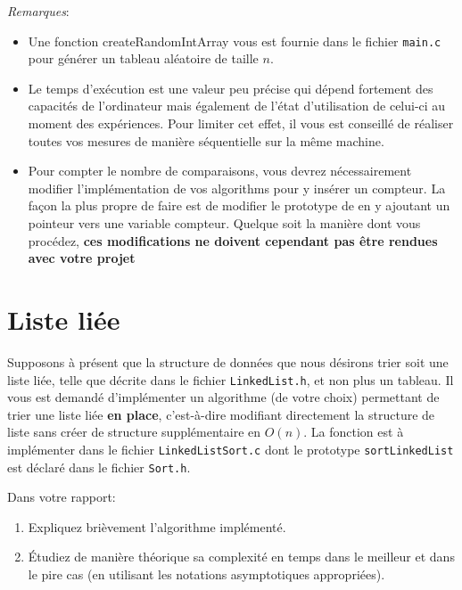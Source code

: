 \documentclass[a4paper,10pt]{article}
\begin{document}
{\em Remarques}:
\begin{itemize}
\item Une fonction createRandomIntArray vous est fournie dans le
  fichier \texttt{main.c} pour générer un tableau aléatoire de taille
  $n$.
\item Le temps d'exécution est une valeur peu précise qui dépend
  fortement des capacités de l'ordinateur mais également de l'état
  d'utilisation de celui-ci au moment des expériences. Pour limiter
  cet effet, il vous est conseillé de réaliser toutes vos mesures de
  manière séquentielle sur la même machine.
\item Pour compter le nombre de comparaisons, vous devrez
nécessairement modifier l'implémentation de vos algorithms pour y
insérer un compteur. La façon la plus propre de faire est de modifier
le prototype de  en y ajoutant un pointeur vers une variable compteur.
Quelque soit la manière dont vous procédez, \textbf{ces modifications ne doivent cependant pas être rendues avec votre projet}
\end{itemize}

\section{Liste liée}

Supposons à présent que la structure de données que nous désirons
trier soit une liste liée, telle que décrite dans le fichier
\texttt{LinkedList.h}, et non plus un tableau. Il vous est demandé
d'implémenter un algorithme (de votre choix) permettant de trier une
liste liée {\bf en place}, c'est-à-dire modifiant directement la
structure de liste sans créer de structure supplémentaire en
$O(n)$. La fonction est à implémenter dans le fichier
\texttt{LinkedListSort.c} dont le prototype \texttt{sortLinkedList}
est déclaré dans le fichier \texttt{Sort.h}.


Dans votre rapport:
\begin{enumerate}
\item Expliquez brièvement l'algorithme implémenté.
\item \'Etudiez de manière théorique sa complexité en temps dans le meilleur et dans le pire cas
(en utilisant les notations asymptotiques appropriées).
\end{enumerate}
\end{document}
